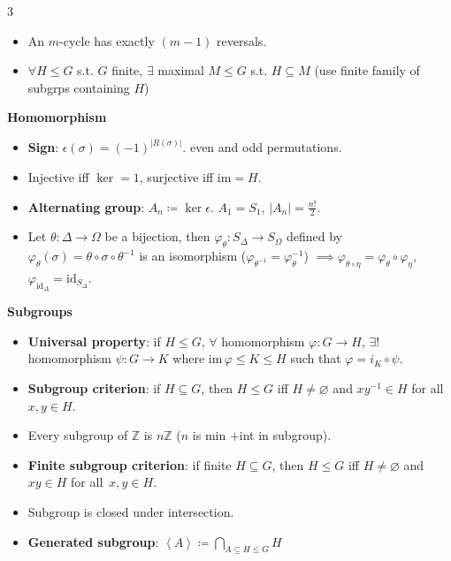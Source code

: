 \documentclass[10pt]{article}
\newcommand{\Z}{\mathbb{Z}} %
\newcommand{\abs}[1]{\left\lvert#1\right\rvert} %
\begin{document}
\begin{multicols*}{3}
\begin{itemize}
            \item An $m$-cycle has exactly $\left(m - 1\right)$ reversals.
            \item $\forall H \leq G$ s.t. $G$ finite, $\exists$ maximal $M \leq G$ s.t. $H \subseteq M$ (use finite family of subgrps containing $H$)
        \end{itemize}
        \textbf{Homomorphism}
        \begin{itemize}
            \setlength\itemsep{2pt}
            \item \textbf{Sign}: $\epsilon\left(\sigma\right) = \left(-1\right)^{\abs{R\left(\sigma\right)}}$. even and odd permutations.
            \item Injective iff $\ker = 1$, surjective iff $\mathrm{im} = H$.
            \item \textbf{Alternating group}: $A_n \coloneqq \ker{\epsilon}$. $A_1 = S_1$, $\abs{A_n} = \frac{n!}{2}$.
            \item Let $\theta \colon \Delta \to \Omega$ be a bijection, then $\varphi_{\theta} \colon S_{\Delta} \to S_{\Omega}$ defined by $\varphi_{\theta}\left(\sigma\right) = \theta \circ \sigma \circ \theta^{-1}$ is an isomorphism ($\varphi_{\theta^{-1}} = \varphi_{\theta}^{-1}$) $\implies \varphi_{\theta \circ \eta} = \varphi_{\theta} \circ \varphi_{\eta}$, $\varphi_{\mathrm{id}_{\Delta}} = \mathrm{id}_{S_{\Delta}}$.
        \end{itemize}
        \textbf{Subgroups}
        \begin{itemize}
            \setlength\itemsep{2pt}
            \item \textbf{Universal property}: if $H \leq G$, $\forall$ homomorphism $\varphi \colon G \to H$, $\exists!$ homomorphism $\psi \colon G \to K$ where $\mathrm{im}\,{\varphi} \leq K \leq H$ such that $\varphi = i_{K} \circ \psi$.
            \item \textbf{Subgroup criterion}: if $H \subseteq G$, then $H \leq G$ iff $H \neq \varnothing$ and $xy^{-1} \in H$ for all~$x, y \in H$.
            \item Every subgroup of $\Z$ is $n\Z$ ($n$ is min $+$int in subgroup).
            \item \textbf{Finite subgroup criterion}: if finite $H \subseteq G$, then $H \leq G$ iff $H \neq \varnothing$ and $xy \in H$ for all~$x, y \in H$.
            \item Subgroup is closed under intersection.
            \item \textbf{Generated subgroup}: $\left\langle A \right\rangle \coloneqq \bigcap_{A \subseteq H \leq G}H$

\end{itemize}
\end{multicols*}
\end{document}
